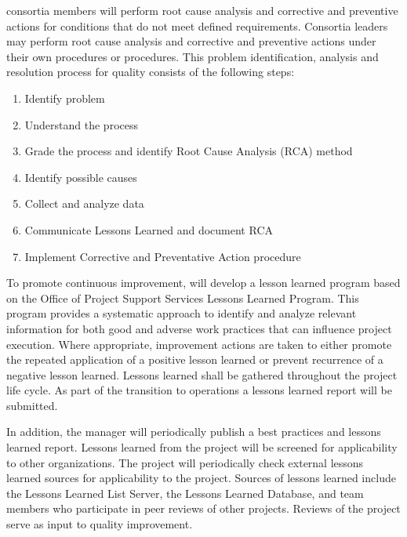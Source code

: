  consortia members will perform root cause analysis and
corrective and preventive actions for conditions that do not meet
defined requirements. Consortia leaders may perform root cause
analysis and corrective and preventive actions under their own
procedures or \fnal procedures.  This problem identification, analysis
and resolution process for quality consists of the following steps:
\begin{enumerate}
  \item Identify problem
  \item Understand the process
  \item Grade the process and identify Root Cause Analysis (RCA)
    method
  \item Identify possible causes
  \item Collect and analyze data
  \item Communicate Lessons Learned and document RCA
  \item Implement Corrective and Preventative Action procedure
\end{enumerate}


To promote continuous improvement,   will develop a
lesson learned program based on the \fnal Office of Project Support
Services Lessons Learned Program. This program provides a systematic
approach to identify and analyze relevant information for both good
and adverse work practices that can influence project execution. Where
appropriate, improvement actions are taken to either promote the
repeated application of a positive lesson learned or prevent
recurrence of a negative lesson learned. Lessons learned shall be
gathered throughout the project life cycle. As part of the transition
to operations a lessons learned report will be submitted.

In addition, the   manager will
periodically publish a best practices and lessons learned
report. Lessons learned from the  project will be screened
for applicability to other organizations. The  project
will periodically check external lessons learned sources for
applicability to the  project. Sources of lessons learned
include the  Lessons Learned List Server, the \fnal {}
Lessons Learned Database, and  team members who
participate in peer reviews of other projects. Reviews of the
 project serve as input to quality improvement.

